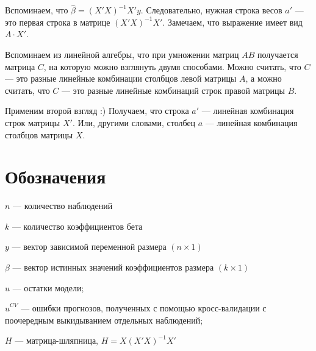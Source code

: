 \documentclass[11pt,russian,]{book}
\begin{document}
Вспоминаем, что \(\hat \beta = (X'X)^{-1}X'y\). Следовательно, нужная строка весов \(a'\) ---
это первая строка в матрице \((X'X)^{-1}X'\).
Замечаем, что выражение имеет вид \(A \cdot X'\).

Вспоминаем из линейной алгебры, что при умножении матриц \(AB\) получается матрица \(C\),
на которую можно взглянуть двумя способами.
Можно считать, что \(C\) --- это разные линейные комбинации столбцов левой матрицы \(A\),
а можно считать, что \(C\) --- это разные линейные комбинаций строк правой матрицы \(B\).

Применим второй взгляд :) Получаем, что строка \(a'\) --- линейная комбинация строк матрицы \(X'\).
Или, другими словами, столбец \(a\) --- линейная комбинация столбцов матрицы \(X\).

\hypertarget{notation}{%
\chapter{Обозначения}\label{notation}}

\(n\) --- количество наблюдений

\(k\) --- количество коэффициентов бета

\(y\) --- вектор зависимой переменной размера \((n\times 1)\)

\(\beta\) --- вектор истинных значений коэффициентов размера \((k \times 1)\)

\(\hat u\) --- остатки модели;

\(\hat u^{CV}\) --- ошибки прогнозов, полученных с помощью кросс-валидации с поочередным выкидыванием отдельных наблюдений;

\(H\) --- матрица-шляпница, \(H = X(X'X)^{-1}X'\)


\end{document}
